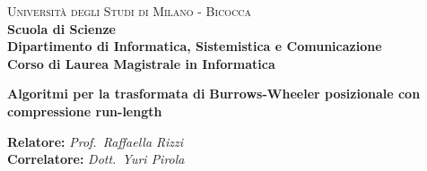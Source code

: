 \documentclass[a4paper,12pt, oneside, draft]{book}
\begin{document}
{} 
\begin{titlepage}
  

  \noindent
  \begin{minipage}[t]{0.19\textwidth}
  \end{minipage}
  \begin{minipage}[t]{0.81\textwidth}
    {
      {\textsc{Università degli Studi di Milano - Bicocca}} \\
      \textbf{Scuola di Scienze} \\
      \textbf{Dipartimento di Informatica, Sistemistica e Comunicazione} \\
      \textbf{Corso di Laurea Magistrale in Informatica} \\
      \par
    }
  \end{minipage}
  
  \vspace{40mm}
  
  \begin{center}
    {\LARGE{
        \textbf{Algoritmi per la trasformata di}}}
    \vspace{1mm}
    {\LARGE{
        \textbf{Burrows-Wheeler posizionale con}}}
    \vspace{1mm}
    {\LARGE{
        \textbf{compressione run-length}}}
    
  \end{center}
  
  \vspace{48mm}

  \noindent
  {\large \textbf{Relatore:} \textit{Prof.~Raffaella Rizzi}} \\

  \noindent
  {\large \textbf{Correlatore:} \textit{Dott.~Yuri Pirola}}
  

\end{titlepage}
\end{document}
